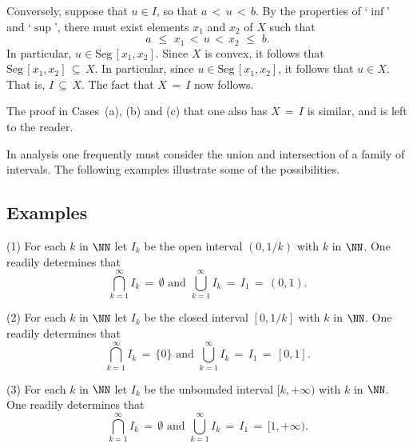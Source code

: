 {        Conversely, suppose that $u{\in}I$, so that $a\,<\,u\,<\,b$.
    By the properties of `$\inf$' and `$\sup$', there must exist elements $x_{1}$ and $x_{2}$ of $X$ such that
        \begin{displaymath}
        a\,\,{\leq}\,\,x_{1}\,<\,u\,<\,x_{2}\,\,{\leq}\,\,b.
        \end{displaymath}
    In particular, $u{\in}\mbox{Seg}\,[x_{1},x_{2}]$.
    Since $X$ is convex, it follows that $\mbox{Seg}\,[x_{1},x_{2}] \,{\subseteq}\, X$.
    In particular, since $u{\in}\mbox{Seg}\,[x_{1},x_{2}]$, it follows that $u{\in}X$. That is, $I \,{\subseteq}\, X$.
    The fact that $X \,=\, I$ now follows.

        The proof in Cases~(a), (b) and (c) that one also has $X \,=\, I$ is similar, and is left to the reader.

\V
\V

        In analysis one frequently must consider the union and intersection of a family of intervals.
    The following examples illustrate some of the possibilities.

\V

            \subsection{\small{\bf Examples}}
            \label{ExampB30.170}

\V

\hspace*{\parindent}(1) For each $k$ in ${\NN}$ let $I_{k}$ be the open interval $(0,1/k)$ with $k$ in ${\NN}$.
    One readily determines that
        \begin{displaymath}
        {\bigcap}_{k=1}^{{\infty}} I_{k} \,=\, {\emptyset} \mbox{ and }
        {\bigcup}_{k=1}^{{\infty}} I_{k} \,=\, I_{1} \,=\, (0,1).
        \end{displaymath}

\V

        (2) For each $k$ in ${\NN}$ let $I_{k}$ be the closed interval $[0,1/k]$ with $k$ in ${\NN}$.
    One readily determines that
        \begin{displaymath}
        {\bigcap}_{k=1}^{{\infty}} I_{k} \,=\, \{0\} \mbox{ and }
        {\bigcup}_{k=1}^{{\infty}} I_{k} \,=\, I_{1} \,=\, [0,1].
        \end{displaymath}

\V

        (3) For each $k$ in ${\NN}$ let $I_{k}$ be the unbounded interval $[k,+{\infty})$ with $k$ in ${\NN}$.
    One readily determines that
        \begin{displaymath}
        {\bigcap}_{k=1}^{{\infty}} I_{k} \,=\, {\emptyset} \mbox{ and }
        {\bigcup}_{k=1}^{{\infty}} I_{k} \,=\, I_{1} \,=\, [1,+{\infty}).
        \end{displaymath}

}
